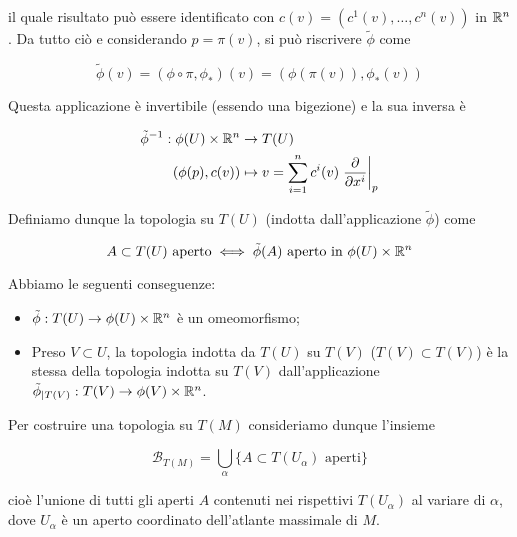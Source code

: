 il quale risultato può essere identificato con $ c(v) = (c^{1}(v),\dots,c^{n}(v)) $ in $ \mathbb{R}^{n} $. Da tutto ciò e considerando $ p = \pi(v) $, si può riscrivere $ \tilde{\phi} $ come

\begin{equation}
	\tilde{\phi}(v) = (\phi \circ \pi,\phi_{*})(v) = (\phi(\pi(v)),\phi_{*}(v))
\end{equation}

Questa applicazione è invertibile (essendo una bigezione) e la sua inversa è

\begin{align}
	\begin{split}
		\tilde{\phi}^{-1} : \phi(U) \times \mathbb{R}^{n} &\to T(U)\\
		(\phi(p),c(v)) &\mapsto v = \sum_{i=1}^{n} c^{i}(v) \left. \dfrac{\partial}{\partial x^{i}} \right|_{p}
	\end{split}
\end{align}

Definiamo dunque la topologia su $ T(U) $ (indotta dall'applicazione $ \tilde{\phi} $) come

\begin{equation}
	A \subset T(U) \text{ aperto} \iff \tilde{\phi}(A) \text{ aperto in } \phi(U) \times \mathbb{R}^{n}
\end{equation}

Abbiamo le seguenti conseguenze:

\begin{itemize}
	\item $ \tilde{\phi} : T(U) \to \phi(U) \times \mathbb{R}^{n} $ è un omeomorfismo;
	
	\item Preso $ V \subset U $, la topologia indotta da $ T(U) $ su $ T(V) $ ($ T(V) \subset T(V) $) è la stessa della topologia indotta su $ T(V) $ dall'applicazione $ \tilde{\phi}_{|T(V)} : T(V) \to \phi(V) \times \mathbb{R}^{n} $.
\end{itemize}

Per costruire una topologia su $ T(M) $ consideriamo dunque l'insieme

\begin{equation}
	\mathcal{B}_{T(M)} = \bigcup_{\alpha} \{ A \subset T(U_{\alpha}) \text{ aperti} \}
\end{equation}

cioè l'unione di tutti gli aperti $ A $ contenuti nei rispettivi $ T(U_{\alpha}) $ al variare di $ \alpha $, dove $ U_{\alpha} $ è un aperto coordinato dell'atlante massimale di $ M $.

